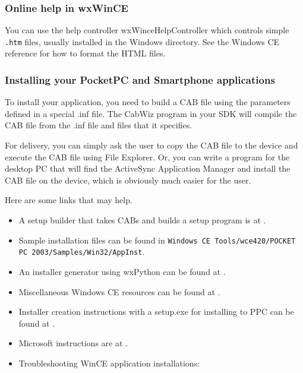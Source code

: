 \subsubsection{Online help in wxWinCE}

You can use the help controller wxWinceHelpController which controls
simple {\tt .htm} files, usually installed in the Windows directory.
See the Windows CE reference for how to format the HTML files.

\subsubsection{Installing your PocketPC and Smartphone applications}

To install your application, you need to build a CAB file using
the parameters defined in a special .inf file. The CabWiz program
in your SDK will compile the CAB file from the .inf file and
files that it specifies.

For delivery, you can simply ask the user to copy the CAB file to the
device and execute the CAB file using File Explorer. Or, you can
write a program for the desktop PC that will find the ActiveSync
Application Manager and install the CAB file on the device,
which is obviously much easier for the user.

Here are some links that may help.

\itemsep=0pt
\begin{itemize}
\item A setup builder that takes CABs and builds a setup program is at .
\item Sample installation files can be found in {\tt Windows CE Tools/wce420/POCKET PC 2003/Samples/Win32/AppInst}.
\item An installer generator using wxPython can be found at .
\item Miscellaneous Windows CE resources can be found at .
\item Installer creation instructions with a setup.exe for installing to PPC can be found at .
\item Microsoft instructions are at .
\item Troubleshooting WinCE application installations: 
\end{itemize}


